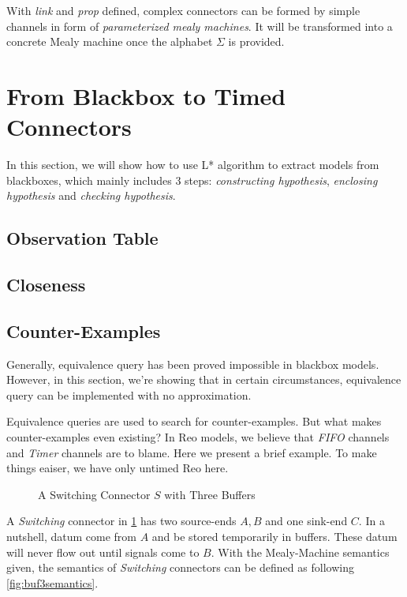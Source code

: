 \documentclass[conference, a4paper]{IEEEtran}
\begin{document}
With \emph{link} and \emph{prop} defined, complex connectors can be formed by simple channels in
form of \emph{parameterized mealy machines}. It will be transformed into a concrete Mealy machine
once the alphabet $\Sigma$ is provided.

\section{From Blackbox to Timed Connectors} 
\label{sec:activelearning}
In this section, we will show how to use L* algorithm to extract models from blackboxes, which
mainly includes 3 steps: \emph{constructing hypothesis}, \emph{enclosing hypothesis} and
\emph{checking hypothesis}.

\subsection{Observation Table}

\subsection{Closeness}

\subsection{Counter-Examples}
Generally, equivalence query has been proved impossible in blackbox
models\cite{DBLP:journals/iandc/Angluin87}. However, in this
section, we're showing that in certain circumstances, equivalence query can be implemented with
no approximation.

Equivalence queries are used to search for counter-examples. But what makes counter-examples even
existing? In Reo models, we believe that \emph{FIFO} channels and \emph{Timer} channels are to
blame. Here we present a brief example. To make things eaiser, we have only untimed Reo here.

\begin{figure}[h]
  \begin{center}
    
  \end{center}
  \caption{A Switching Connector $S$ with Three Buffers}
  \label{fig:buf3}
\end{figure}

A \emph{Switching} connector in \figurename \ref{fig:buf3} has two source-ends $A,B$ and one
sink-end $C$. In a nutshell, datum come from $A$ and be stored temporarily in buffers. These datum
will never flow out until signals come to $B$. With the Mealy-Machine semantics given, the semantics
of \emph{Switching} connectors can be defined as following \figurename \ref{fig:buf3semantics}.
\end{document}
